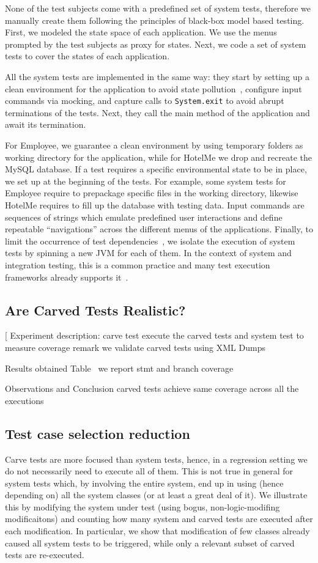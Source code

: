 \documentclass[10pt,conference]{IEEEtran}
\makeatletter
\gdef\xxx{\@ifnextchar[\xxx@lab\xxx@nolab}
\makeatother
\begin{document}
None of the test subjects come with a predefined set of system tests, therefore we manually create them
following the principles of black-box model based testing.
First, we modeled the state space of each application. We use the menus prompted by the test subjects 
as proxy for states. Next, we code a set of system tests to cover the states of each application.

All the system tests are implemented in the same way:
they start by setting up a clean environment for the application to avoid state pollution~\cite{pollution},
configure input commands via mocking, and capture calls to \texttt{System.exit} to avoid abrupt terminations of the tests.
Next, they call the main method of the application and await its termination.

For Employee, we guarantee a clean environment by using temporary folders as working directory for the application,
while for HotelMe we drop and recreate the MySQL database.
If a test requires a specific environmental state to be in place, we set up at the beginning of the tests.
For example, some system tests for Employee require to prepackage specific files in the working directory, likewise
HotelMe requires to fill up the database with testing data.
%
Input commands are sequences of strings which emulate predefined user interactions and define repeatable ``navigations''
across the different menus of the applications.
Finally, to limit the occurrence of test dependencies~\cite{}, we isolate the execution of system tests by spinning a new JVM
for each of them. In the context of system and integration testing, this is a common practice and many test execution
frameworks already supports it~\cite{surefire:fork}.

\subsection{Are Carved Tests Realistic?}
\xxx{RQ1 and RQ2}
Experiment description:
	carve test
	execute the carved tests and system test to measure coverage
	remark we validate carved tests using XML Dumps

Results obtained Table~
	we report stmt and branch coverage
	
Observations and Conclusion
	carved tests achieve same coverage across all the executions

\subsection{Test case selection reduction}
Carve tests are more focused than system tests, hence, in a regression setting we do not necessarily need 
to execute all of them. This is not true in general for system tests which, by involving the entire system, end up in using (hence depending on)
all the system classes (or at least a great deal of it).
%
We illustrate this by modifying the system under test (using bogus, non-logic-modifing modificaitons) and counting how many system and carved
tests are executed after each modification. In particular, we show that modification of few classes already caused all system tests to be triggered,
while only a relevant subset of carved tests are re-executed.
\end{document}
